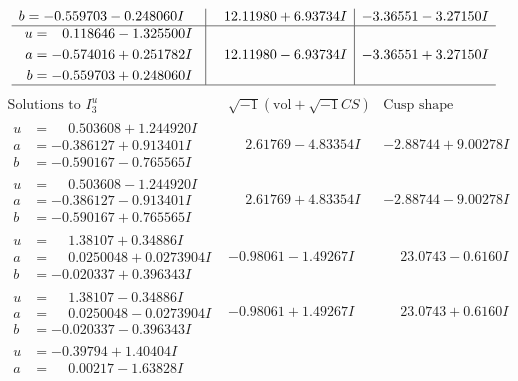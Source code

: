 \documentclass[1p]{elsarticle_modified}
\theoremstyle{definition}
\newcommand{\I}{\sqrt{-1}}
\begin{document}
$$\begin{array}{c|c|c}
\begin{aligned}
b &= -0.559703 - 0.248060 I\end{aligned}
 & \phantom{-}12.11980 + 6.93734 I & -3.36551 - 3.27150 I \\ \hline\begin{aligned}
u &= \phantom{-}0.118646 - 1.325500 I \\
a &= -0.574016 + 0.251782 I \\
b &= -0.559703 + 0.248060 I\end{aligned}
 & \phantom{-}12.11980 - 6.93734 I & -3.36551 + 3.27150 I\\
 \hline 
 \end{array}$$\newpage$$\begin{array}{c|c|c}  
\text{Solutions to }I^u_{3}& \I (\text{vol} + \sqrt{-1}CS) & \text{Cusp shape}\\
 \hline 
\begin{aligned}
u &= \phantom{-}0.503608 + 1.244920 I \\
a &= -0.386127 + 0.913401 I \\
b &= -0.590167 - 0.765565 I\end{aligned}
 & \phantom{-}2.61769 - 4.83354 I & -2.88744 + 9.00278 I \\ \hline\begin{aligned}
u &= \phantom{-}0.503608 - 1.244920 I \\
a &= -0.386127 - 0.913401 I \\
b &= -0.590167 + 0.765565 I\end{aligned}
 & \phantom{-}2.61769 + 4.83354 I & -2.88744 - 9.00278 I \\ \hline\begin{aligned}
u &= \phantom{-}1.38107 + 0.34886 I \\
a &= \phantom{-}0.0250048 + 0.0273904 I \\
b &= -0.020337 + 0.396343 I\end{aligned}
 & -0.98061 - 1.49267 I & \phantom{-}23.0743 - 0.6160 I \\ \hline\begin{aligned}
u &= \phantom{-}1.38107 - 0.34886 I \\
a &= \phantom{-}0.0250048 - 0.0273904 I \\
b &= -0.020337 - 0.396343 I\end{aligned}
 & -0.98061 + 1.49267 I & \phantom{-}23.0743 + 0.6160 I \\ \hline\begin{aligned}
u &= -0.39794 + 1.40404 I \\
a &= \phantom{-}0.00217 - 1.63828 I \\

\end{aligned}
\end{array}$$
\end{document}
